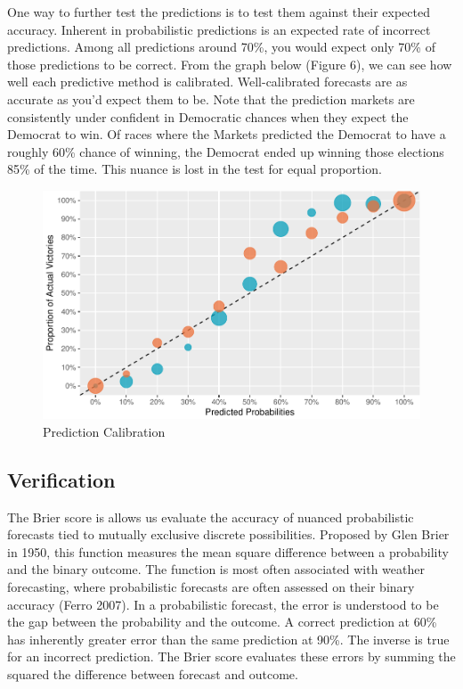 \documentclass[11pt,]{article}
\begin{document}
One way to further test the predictions is to test them against their
expected accuracy. Inherent in probabilistic predictions is an expected
rate of incorrect predictions. Among all predictions around 70\%, you
would expect only 70\% of those predictions to be correct. From the
graph below (Figure 6), we can see how well each predictive method is
calibrated. Well-calibrated forecasts are as accurate as you'd expect
them to be. Note that the prediction markets are consistently under
confident in Democratic chances when they expect the Democrat to win. Of
races where the Markets predicted the Democrat to have a roughly 60\%
chance of winning, the Democrat ended up winning those elections 85\% of
the time. This nuance is lost in the test for equal proportion.

\begin{figure}
\centering
\includegraphics{paper_files/figure-latex/plot_calibration-1.pdf}
\caption{Prediction Calibration}
\end{figure}

\hypertarget{verification}{%
\subsection{Verification}\label{verification}}

The Brier score is allows us evaluate the accuracy of nuanced
probabilistic forecasts tied to mutually exclusive discrete
possibilities. Proposed by Glen Brier in 1950, this function measures
the mean square difference between a probability and the binary outcome.
The function is most often associated with weather forecasting, where
probabilistic forecasts are often assessed on their binary accuracy
(Ferro 2007). In a probabilistic forecast, the error is understood to be
the gap between the probability and the outcome. A correct prediction at
60\% has inherently greater error than the same prediction at 90\%. The
inverse is true for an incorrect prediction. The Brier score evaluates
these errors by summing the squared the difference between forecast and
outcome.
\end{document}
